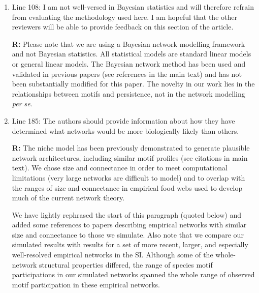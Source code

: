 \documentclass[12pt]{article}
\begin{document}
\begin{enumerate}
            \item Line 108: I am not well-versed in Bayesian statistics and will therefore refrain from evaluating the methodology used here. I am hopeful that the other reviewers will be able to provide feedback on this section of the article.

                \textbf{R:} Please note that we are using a Bayesian network modelling framework and not Bayesian statistics. All statistical models are  standard linear models or general linear models. The Bayesian network method has been used and validated in previous papers (see references in the main text) and has not been substantially modified for this paper. The novelty in our work lies in the relationships between motifs and persistence, not in the network modelling \emph{per se}.


            \item Line 185: The authors should provide information about how they have determined what networks would be more biologically likely than others.

                \textbf{R:} The niche model has been previously demonstrated to generate plausible network architectures, including similar motif profiles (see citations in main text). We chose size and connectance in order to meet computational limitations (very large networks are difficult to model) and to overlap with the ranges of size and connectance in empirical food webs used to develop much of the current network theory. 


                We have lightly rephrased the start of this paragraph (quoted below) and added some references to papers describing empirical networks with similar size and connectance to those we simulate.
                Also note that we compare our simulated results with results for a set of more recent, larger, and especially well-resolved empirical networks in the SI. Although some of the whole-network structural properties differed, the range of species motif participations in our simulated networks spanned the whole range of observed motif participation in these empirical networks.



\end{enumerate}
\end{document}
